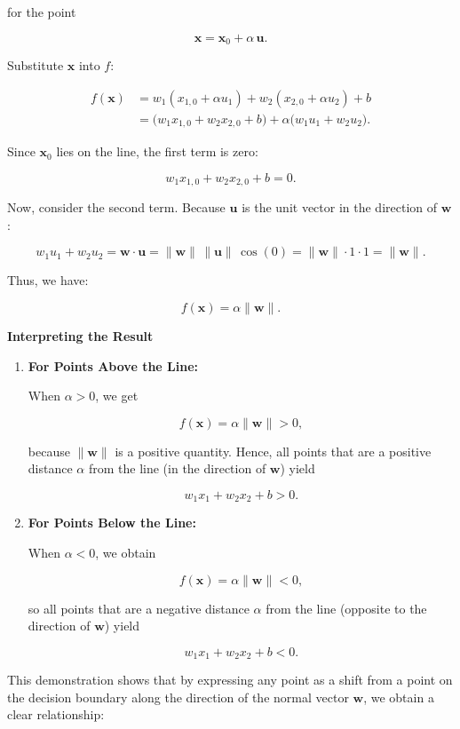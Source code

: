 \documentclass[11pt]{article}
\begin{document}
for the point

$$
\mathbf{x} = \mathbf{x}_0 + \alpha\, \mathbf{u}.
$$

Substitute $\mathbf{x}$ into $f$:

$$
\begin{aligned}
f(\mathbf{x}) &= w_1 (x_{1,0} + \alpha u_1) + w_2 (x_{2,0} + \alpha u_2) + b \\
&= \bigl(w_1 x_{1,0} + w_2 x_{2,0} + b\bigr) + \alpha \bigl(w_1 u_1 + w_2 u_2\bigr).
\end{aligned}
$$

Since $\mathbf{x}_0$ lies on the line, the first term is zero:

$$
w_1 x_{1,0} + w_2 x_{2,0} + b = 0.
$$

Now, consider the second term. Because $\mathbf{u}$ is the unit vector
in the direction of $\mathbf{w}$:

$$
w_1 u_1 + w_2 u_2 = \mathbf{w} \cdot \mathbf{u} = \|\mathbf{w}\| \, \|\mathbf{u}\| \, \cos(0) = \|\mathbf{w}\| \cdot 1 \cdot 1 = \|\mathbf{w}\|.
$$

Thus, we have:

$$
f(\mathbf{x}) = \alpha \|\mathbf{w}\|.
$$

\textbf{Interpreting the Result}

\begin{enumerate}
\def\labelenumi{\arabic{enumi}.}
\item
  \textbf{For Points Above the Line:}

  When $\alpha > 0$, we get

  $$
  f(\mathbf{x}) = \alpha \|\mathbf{w}\| > 0,
  $$

  because $\|\mathbf{w}\|$ is a positive quantity. Hence, all points
  that are a positive distance $\alpha$ from the line (in the
  direction of $ \mathbf{w} $) yield

  $$
  w_1 x_1 + w_2 x_2 + b > 0.
  $$
\item
  \textbf{For Points Below the Line:}

  When $\alpha < 0$, we obtain

  $$
  f(\mathbf{x}) = \alpha \|\mathbf{w}\| < 0,
  $$

  so all points that are a negative distance $\alpha$ from the line
  (opposite to the direction of $ \mathbf{w} $) yield

  $$
  w_1 x_1 + w_2 x_2 + b < 0.
  $$
\end{enumerate}

This demonstration shows that by expressing any point as a shift from a
point on the decision boundary along the direction of the normal vector
$ \mathbf{w} $, we obtain a clear relationship:
\end{document}
